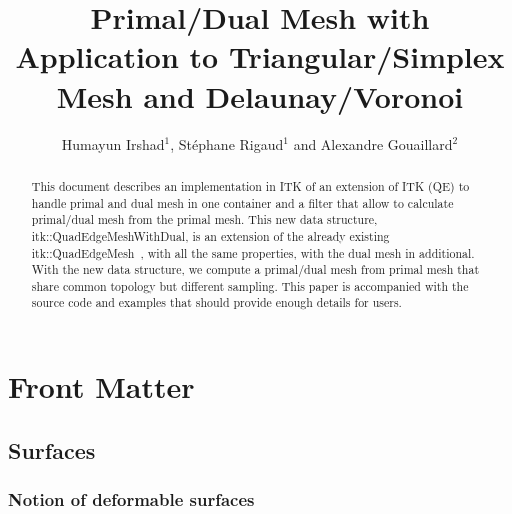 \documentclass{InsightArticle}
\title{Primal/Dual Mesh with Application to Triangular/Simplex Mesh and Delaunay/Voronoi}
\author{Humayun Irshad$^{1}$, St\'{e}phane Rigaud$^{1}$ and Alexandre Gouaillard$^{2}$}
\newcommand{\IJhandlerIDnumber}{1338} %
\begin{document}
%
% 
\IJhandlefooter{\IJhandlerIDnumber}


\ifpdf
\else
\fi


\maketitle


\ifhtml
\chapter*{Front Matter\label{front}}
\fi


\begin{abstract}
\noindent
This document describes an implementation in ITK of an extension of ITK (QE) to handle primal and dual mesh in one container and a filter that allow to calculate primal/dual mesh from the primal mesh. This new data structure, itk::QuadEdgeMeshWithDual, is an extension of the already existing itk::QuadEdgeMesh~\cite{Gouaillard2006}, with all the same properties, with the dual mesh in additional. With the new data structure, we compute a primal/dual mesh from primal mesh that share common topology but different sampling. This paper is accompanied with the source code and examples that should provide enough details for users.
\end{abstract}
\IJhandlenote{\IJhandlerIDnumber}
\tableofcontents
\section{Surfaces}
\subsection{Notion of deformable surfaces}
\end{document}
